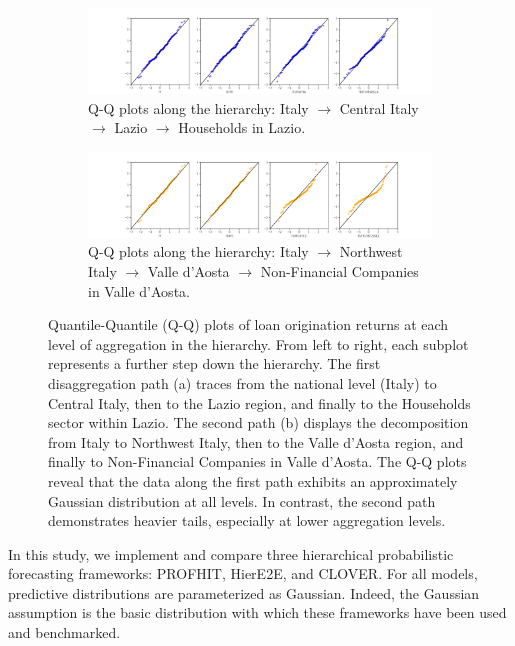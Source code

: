 \documentclass[letterpaper]{article}
\begin{document}
\begin{figure}
    \centering
     \begin{subfigure}[b]{\textwidth}
         \centering
         \includegraphics[width=\textwidth]{QQplots_lazio.png}
         \caption{Q-Q plots along the hierarchy: Italy $\rightarrow$ Central Italy $\rightarrow$ Lazio $\rightarrow$ Households in Lazio.}
         \label{fig:qqsub1}
     \end{subfigure}
     \begin{subfigure}[b]{\textwidth}
         \centering
         \includegraphics[width=\textwidth]{QQplots_valee.png}
         \caption{Q-Q plots along the hierarchy: Italy $\rightarrow$ Northwest Italy $\rightarrow$ Valle d'Aosta $\rightarrow$ Non-Financial Companies in Valle d'Aosta.}
         \label{fig:qqsub2}
     \end{subfigure}
     \hfill
        \caption{
Quantile-Quantile (Q-Q) plots of loan origination returns at each level of aggregation in the hierarchy. From left to right, each subplot represents a further step down the hierarchy. The first disaggregation path (a) traces from the national level (Italy) to Central Italy, then to the Lazio region, and finally to the Households sector within Lazio. The second path (b) displays the decomposition from Italy to Northwest Italy, then to the Valle d'Aosta region, and finally to Non-Financial Companies in Valle d'Aosta. The Q-Q plots reveal that the data along the first path exhibits an approximately Gaussian distribution at all levels. In contrast, the second path demonstrates heavier tails, especially at lower aggregation levels.
}
        \label{fig:qqplots}
\end{figure}

In this study, we implement and compare three hierarchical probabilistic forecasting frameworks: PROFHIT, HierE2E, and CLOVER. 
For all models, predictive distributions are parameterized as Gaussian. 
Indeed, the Gaussian assumption is the basic distribution with which these frameworks have been used and benchmarked. 
\end{document}
